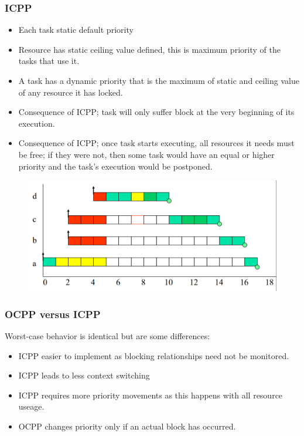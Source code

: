 \subsubsection{ICPP}
\begin{itemize}
\item Each task static default priority
\item Resource has static ceiling value defined, this is maximum priority of the tasks that use it.
\item A task has a dynamic priority that is the maximum of static and ceiling value of any resource it has locked.
\item Consequence of ICPP; task will only suffer block at the very beginning of its execution.
\item Consequence of ICPP; once task starts executing, all resources it needs must be free; if they were not, then some task would have an equal or higher priority and the task's execution would be postponed.
\end{itemize}
\begin{figure}[H]
\centering
\includegraphics[width=0.9\linewidth]{figures/Scheduling/Priority Inversion/ICPP.PNG}
\end{figure}

\subsubsection{OCPP versus ICPP}
Worst-case behavior is identical but are some differences:
\begin{itemize}
\item ICPP easier to implement as blocking relationships need not be monitored.
\item ICPP leads to less context switching
\item ICPP requires more priority movements as this happens with all resource useage.
\item OCPP changes priority only if an actual block has occurred.
\end{itemize}

